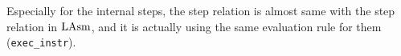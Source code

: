 Especially for the internal steps, 
the step relation is almost same with the step relation in $\mathrm{LAsm}$, and 
it is actually using the same evaluation rule for them (\lstinline$exec_instr$). 


%


